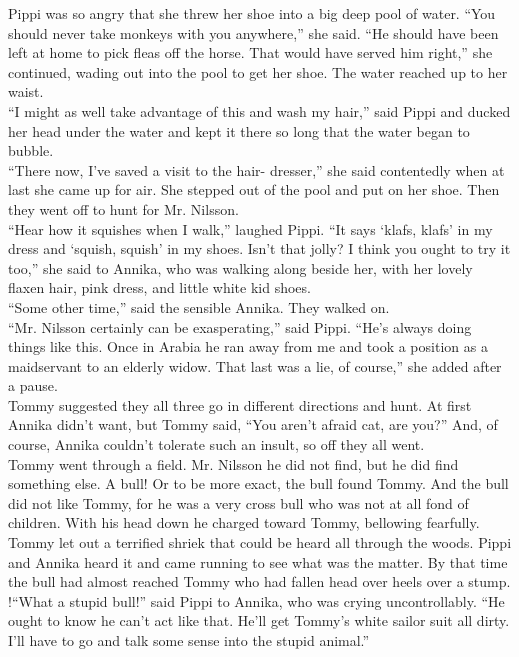 \documentclass{standard}
\begin{document}
Pippi was so angry that she threw her shoe into a big deep pool of water. “You should never take monkeys with you anywhere,” she said. “He should have been left at home to pick fleas off the horse. That would have served him right,” she continued, wading out into the pool to get her shoe. The water reached up to her waist.\\

“I might as well take advantage of this and wash my hair,” said Pippi and ducked her head under the water and kept it there so long that the water began to bubble.\\

“There now, I’ve saved a visit to the hair- dresser,” she said contentedly when at last she came up for air. She stepped out of the pool and put on her shoe. Then they went off to hunt for Mr. Nilsson.\\

“Hear how it squishes when I walk,” laughed Pippi. “It says ‘klafs, klafs’ in my dress and ‘squish, squish’ in my shoes. Isn’t that jolly? I think you ought to try it too,” she said to Annika, who was walking along beside her, with her lovely flaxen hair, pink dress, and little white kid shoes.\\

“Some other time,” said the sensible Annika. They walked on.\\

“Mr. Nilsson certainly can be exasperating,” said Pippi. “He’s always doing things like this. Once in Arabia he ran away from me and took a position as a maidservant to an elderly widow. That last was a lie, of course,” she added after a pause.\\

Tommy suggested they all three go in different directions and hunt. At first Annika didn’t want, but Tommy said, “You aren’t afraid cat, are you?” And, of course, Annika couldn’t tolerate such an insult, so off they all went.\\

Tommy went through a field. Mr. Nilsson he did not find, but he did find something else. A bull! Or to be more exact, the bull found Tommy. And the bull did not like Tommy, for he was a very cross bull who was not at all fond of children. With his head down he charged toward Tommy, bellowing fearfully. Tommy let out a terrified shriek that could be heard all through the woods. Pippi and Annika heard it and came running to see what was the matter. By that time the bull had almost reached Tommy who had fallen head over heels over a stump. !“What a stupid bull!” said Pippi to Annika, who was crying uncontrollably. “He ought to know he can’t act like that. He’ll get Tommy’s white sailor suit all dirty. I’ll have to go and talk some sense into the stupid animal.”\\
\end{document}
